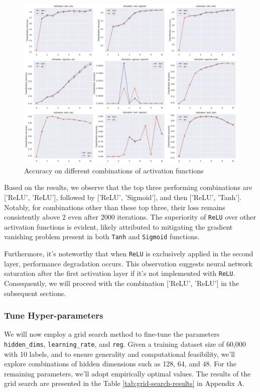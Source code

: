 \documentclass[10pt,a4paper,twoside]{tau}
\begin{document}
\begin{figure}[htbp]
    \centering
    \includegraphics[scale=0.21]{images/activation_acc.png}
    \caption{Accuracy on different combinations of activation functions}
    \label{fig:activation-acc}
\end{figure}

Based on the results, we observe that the top three performing combinations are ['ReLU', 'ReLU'], followed by ['ReLU', 'Sigmoid'], and then ['ReLU', 'Tanh']. Notably, for combinations other than these top three, their loss remains consistently above 2 even after 2000 iterations. The superiority of \texttt{ReLU} over other activation functions is evident, likely attributed to mitigating the gradient vanishing problem present in both \texttt{Tanh} and \texttt{Sigmoid} functions.

Furthermore, it's noteworthy that when \texttt{ReLU} is exclusively applied in the second layer, performance degradation occurs. This observation suggests neural network saturation after the first activation layer if it's not implemented with \texttt{ReLU}. Consequently, we will proceed with the combination ['ReLU', 'ReLU'] in the subsequent sections.


\subsubsection{Tune Hyper-parameters}

We will now employ a grid search method to fine-tune the parameters \texttt{hidden\_dims}, \texttt{learning\_rate}, and \texttt{reg}. Given a training dataset size of 60,000 with 10 labels, and to ensure generality and computational feasibility, we'll explore combinations of hidden dimensions such as 128, 64, and 48. For the remaining parameters, we'll adopt empirically optimal values. The results of the grid search are presented in the Table \ref{tab:grid-search-results} in Appendix A.
\end{document}
